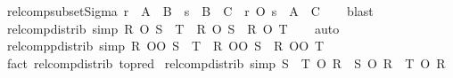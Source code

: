 \begin{isabellebody}
\endisatagproof
{\isafoldproof}%
%
\isadelimproof
\isanewline
%
\endisadelimproof
\isanewline
{}\isamarkupfalse%
\ relcomp{\isacharunderscore}{\kern0pt}subset{\isacharunderscore}{\kern0pt}Sigma{\isacharcolon}{\kern0pt}\ {\isachardoublequoteopen}r\ {\isasymsubseteq}\ A\ {\isasymtimes}\ B\ {\isasymLongrightarrow}\ s\ {\isasymsubseteq}\ B\ {\isasymtimes}\ C\ {\isasymLongrightarrow}\ r\ O\ s\ {\isasymsubseteq}\ A\ {\isasymtimes}\ C{\isachardoublequoteclose}\isanewline
%
\isadelimproof
\ \ %
\endisadelimproof
%
\isatagproof
{}\isamarkupfalse%
\ blast%
\endisatagproof
{\isafoldproof}%
%
\isadelimproof
\isanewline
%
\endisadelimproof
\isanewline
{}\isamarkupfalse%
\ relcomp{\isacharunderscore}{\kern0pt}distrib\ {\isacharbrackleft}{\kern0pt}simp{\isacharbrackright}{\kern0pt}{\isacharcolon}{\kern0pt}\ {\isachardoublequoteopen}R\ O\ {\isacharparenleft}{\kern0pt}S\ {\isasymunion}\ T{\isacharparenright}{\kern0pt}\ {\isacharequal}{\kern0pt}\ {\isacharparenleft}{\kern0pt}R\ O\ S{\isacharparenright}{\kern0pt}\ {\isasymunion}\ {\isacharparenleft}{\kern0pt}R\ O\ T{\isacharparenright}{\kern0pt}{\isachardoublequoteclose}\isanewline
%
\isadelimproof
\ \ %
\endisadelimproof
%
\isatagproof
{}\isamarkupfalse%
\ auto%
\endisatagproof
{\isafoldproof}%
%
\isadelimproof
\isanewline
%
\endisadelimproof
\isanewline
{}\isamarkupfalse%
\ relcompp{\isacharunderscore}{\kern0pt}distrib\ {\isacharbrackleft}{\kern0pt}simp{\isacharbrackright}{\kern0pt}{\isacharcolon}{\kern0pt}\ {\isachardoublequoteopen}R\ OO\ {\isacharparenleft}{\kern0pt}S\ {\isasymsqunion}\ T{\isacharparenright}{\kern0pt}\ {\isacharequal}{\kern0pt}\ R\ OO\ S\ {\isasymsqunion}\ R\ OO\ T{\isachardoublequoteclose}\isanewline
%
\isadelimproof
\ \ %
\endisadelimproof
%
\isatagproof
{}\isamarkupfalse%
\ {\isacharparenleft}{\kern0pt}fact\ relcomp{\isacharunderscore}{\kern0pt}distrib\ {\isacharbrackleft}{\kern0pt}to{\isacharunderscore}{\kern0pt}pred{\isacharbrackright}{\kern0pt}{\isacharparenright}{\kern0pt}%
\endisatagproof
{\isafoldproof}%
%
\isadelimproof
\isanewline
%
\endisadelimproof
\isanewline
{}\isamarkupfalse%
\ relcomp{\isacharunderscore}{\kern0pt}distrib{}\ {\isacharbrackleft}{\kern0pt}simp{\isacharbrackright}{\kern0pt}{\isacharcolon}{\kern0pt}\ {\isachardoublequoteopen}{\isacharparenleft}{\kern0pt}S\ {\isasymunion}\ T{\isacharparenright}{\kern0pt}\ O\ R\ {\isacharequal}{\kern0pt}\ {\isacharparenleft}{\kern0pt}S\ O\ R{\isacharparenright}{\kern0pt}\ {\isasymunion}\ {\isacharparenleft}{\kern0pt}T\ O\ R{\isacharparenright}{\kern0pt}{\isachardoublequoteclose}\isanewline

\end{isabellebody}
